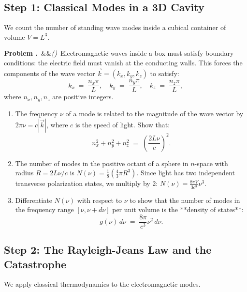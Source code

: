 \documentclass[12pt, a4paper, twoside]{book}
\newcounter{problem}[chapter]
\newcommand{\problem}[1][]{\refstepcounter{problem}\medskip\noindent
  \textcolor{accent}{\textbf{Problem \theproblem.}}\ \ifx&#1&\else\textit{(#1)}\ \fi}
\begin{document}
\subsection{Step 1: Classical Modes in a 3D Cavity}

We count the number of standing wave modes inside a cubical container of volume $V = L^3$.

\begin{explobox}
\problem Electromagnetic waves inside a box must satisfy boundary conditions: the electric field must vanish at the conducting walls. This forces the components of the wave vector $\vec{k} = (k_x, k_y, k_z)$ to satisfy:
\[
  k_x \;=\; \frac{n_x \pi}{L}, \quad k_y \;=\; \frac{n_y \pi}{L}, \quad k_z \;=\; \frac{n_z \pi}{L},
\]
where $n_x, n_y, n_z$ are positive integers.
\begin{enumerate}[label=(\alph*), topsep=2pt]
  \item The frequency $\nu$ of a mode is related to the magnitude of the wave vector by $2\pi\nu = c |\vec{k}|$, where $c$ is the speed of light. Show that:
  \[
    n_x^2 + n_y^2 + n_z^2 \;=\; \left(\frac{2 L \nu}{c}\right)^2.
  \]
  \item The number of modes in the positive octant of a sphere in $n$-space with radius $R = 2L\nu/c$ is $N(\nu) = \frac{1}{8} \left( \frac{4}{3} \pi R^3 \right)$. Since light has two independent transverse polarization states, we multiply by 2: $N(\nu) = \frac{8\pi V}{3 c^3} \nu^3$.
  \item Differentiate $N(\nu)$ with respect to $\nu$ to show that the number of modes in the frequency range $[\nu, \nu + d\nu]$ per unit volume is the **density of states**:
  \[
    g(\nu) \, d\nu \;=\; \frac{8\pi}{c^3} \nu^2 \, d\nu.
  \]
\end{enumerate}
\end{explobox}

\subsection{Step 2: The Rayleigh-Jeans Law and the Catastrophe}

We apply classical thermodynamics to the electromagnetic modes.
\end{document}
